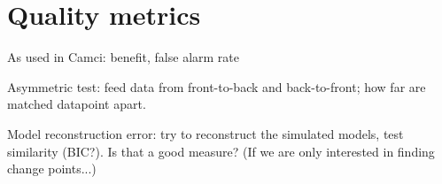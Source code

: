 \section{Quality metrics}
As used in Camci: benefit, false alarm rate

Asymmetric test: feed data from front-to-back and back-to-front; how far are matched datapoint apart.

Model reconstruction error: try to reconstruct the simulated models, test similarity (BIC?). Is that a good measure? (If we are only interested in finding change points...)

